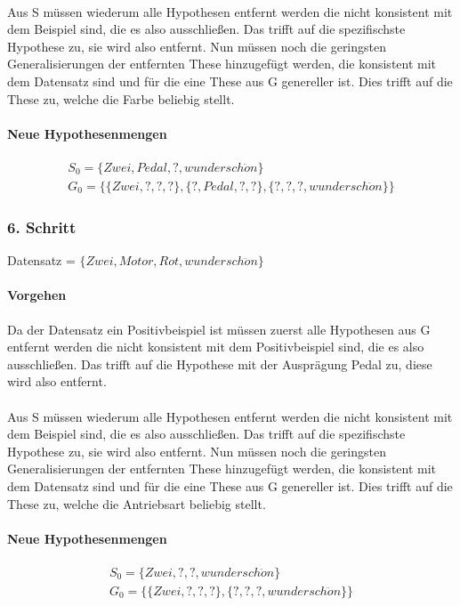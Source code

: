 \documentclass[a4paper]{article}
\begin{document}
\paragraph{}
Aus S müssen wiederum alle Hypothesen entfernt werden die nicht konsistent mit dem Beispiel sind, die es also ausschließen. Das trifft auf die spezifischste Hypothese zu, sie wird also entfernt. Nun müssen noch die geringsten Generalisierungen der entfernten These hinzugefügt werden, die konsistent mit dem Datensatz sind und für die eine These aus G genereller ist. Dies trifft auf die These zu, welche die Farbe beliebig stellt.
\paragraph{Neue Hypothesenmengen}
\begin{align*}
	S_0 = \{Zwei,Pedal,?,wundersch\ddot{o}n\} \\
	G_0 = \{ \{Zwei,?,?,?\},\{?,Pedal,?,?\}, \{?,?,?,wundersch\ddot{o}n\} \}
\end{align*}

\subsubsection{6. Schritt}
Datensatz = $ \{Zwei, Motor, Rot, wundersch\ddot{o}n\} $
\paragraph{Vorgehen}
Da der Datensatz ein Positivbeispiel ist müssen zuerst alle Hypothesen aus G entfernt werden die nicht konsistent mit dem Positivbeispiel sind, die es also ausschließen. Das trifft auf die Hypothese mit der Ausprägung Pedal zu, diese wird also entfernt. 
\paragraph{}
Aus S müssen wiederum alle Hypothesen entfernt werden die nicht konsistent mit dem Beispiel sind, die es also ausschließen. Das trifft auf die spezifischste Hypothese zu, sie wird also entfernt. Nun müssen noch die geringsten Generalisierungen der entfernten These hinzugefügt werden, die konsistent mit dem Datensatz sind und für die eine These aus G genereller ist. Dies trifft auf die These zu, welche die Antriebsart beliebig stellt.
\paragraph{Neue Hypothesenmengen}
\begin{align*}
	S_0 = \{Zwei,?,?,wundersch\ddot{o}n\} \\
	G_0 = \{ \{Zwei,?,?,?\}, \{?,?,?,wundersch\ddot{o}n\} \}
\end{align*}
\end{document}
